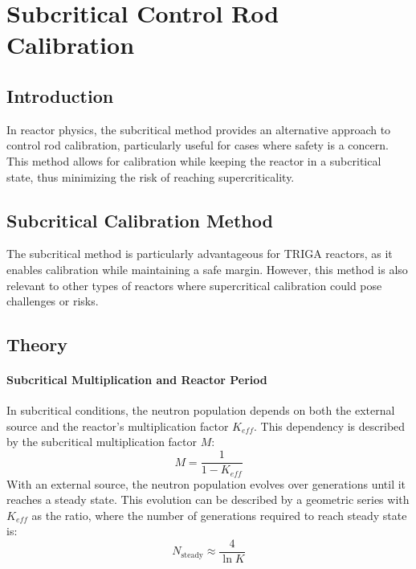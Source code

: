 \section{Subcritical Control Rod Calibration}

\subsection{Introduction}
In reactor physics, the subcritical method provides an alternative approach to control rod calibration, particularly useful for cases where safety is a concern. This method allows for calibration while keeping the reactor in a subcritical state, thus minimizing the risk of reaching supercriticality.

\subsection{Subcritical Calibration Method}
The subcritical method is particularly advantageous for TRIGA reactors, as it enables calibration while maintaining a safe margin. However, this method is also relevant to other types of reactors where supercritical calibration could pose challenges or risks.

\subsection{Theory}
\paragraph{Subcritical Multiplication and Reactor Period}
In subcritical conditions, the neutron population depends on both the external source and the reactor’s multiplication factor $K_{eff}$. This dependency is described by the subcritical multiplication factor $M$:
\begin{equation}
    M = \frac{1}{1 - K_{eff}}
\end{equation}
With an external source, the neutron population evolves over generations until it reaches a steady state. This evolution can be described by a geometric series with $K_{eff}$ as the ratio, where the number of generations required to reach steady state is:
\begin{equation}
    N_{\text{steady}} \approx \frac{4}{\ln K}
\end{equation}

